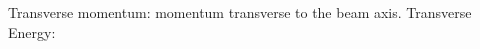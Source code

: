\documentclass{article}
\begin{document}
	Transverse momentum: momentum transverse to the beam axis.
	Transverse Energy: 
\end{document}
